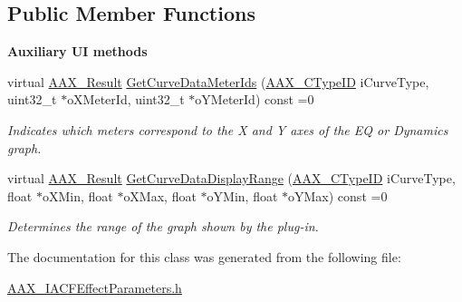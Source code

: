 \subsection*{Public Member Functions}
\begin{Indent}{\bf Auxiliary U\+I methods}\par
\begin{DoxyCompactItemize}
\item 
virtual \hyperlink{a00149_a4d8f69a697df7f70c3a8e9b8ee130d2f}{A\+A\+X\+\_\+\+Result} \hyperlink{a00342_gac7ba3c1063c35d761fdeba9c9a6cc0d1}{Get\+Curve\+Data\+Meter\+Ids} (\hyperlink{a00149_ac678f9c1fbcc26315d209f71a147a175}{A\+A\+X\+\_\+\+C\+Type\+I\+D} i\+Curve\+Type, uint32\+\_\+t $\ast$o\+X\+Meter\+Id, uint32\+\_\+t $\ast$o\+Y\+Meter\+Id) const =0
\begin{DoxyCompactList}\small\item\em Indicates which meters correspond to the X and Y axes of the E\+Q or Dynamics graph. \end{DoxyCompactList}\item 
virtual \hyperlink{a00149_a4d8f69a697df7f70c3a8e9b8ee130d2f}{A\+A\+X\+\_\+\+Result} \hyperlink{a00342_ga38d1ac0c15a7052904077ef0e2527e0d}{Get\+Curve\+Data\+Display\+Range} (\hyperlink{a00149_ac678f9c1fbcc26315d209f71a147a175}{A\+A\+X\+\_\+\+C\+Type\+I\+D} i\+Curve\+Type, float $\ast$o\+X\+Min, float $\ast$o\+X\+Max, float $\ast$o\+Y\+Min, float $\ast$o\+Y\+Max) const =0
\begin{DoxyCompactList}\small\item\em Determines the range of the graph shown by the plug-\/in. \end{DoxyCompactList}\end{DoxyCompactItemize}
\end{Indent}


The documentation for this class was generated from the following file\+:\begin{DoxyCompactItemize}
\item 
\hyperlink{a00224}{A\+A\+X\+\_\+\+I\+A\+C\+F\+Effect\+Parameters.\+h}\end{DoxyCompactItemize}
